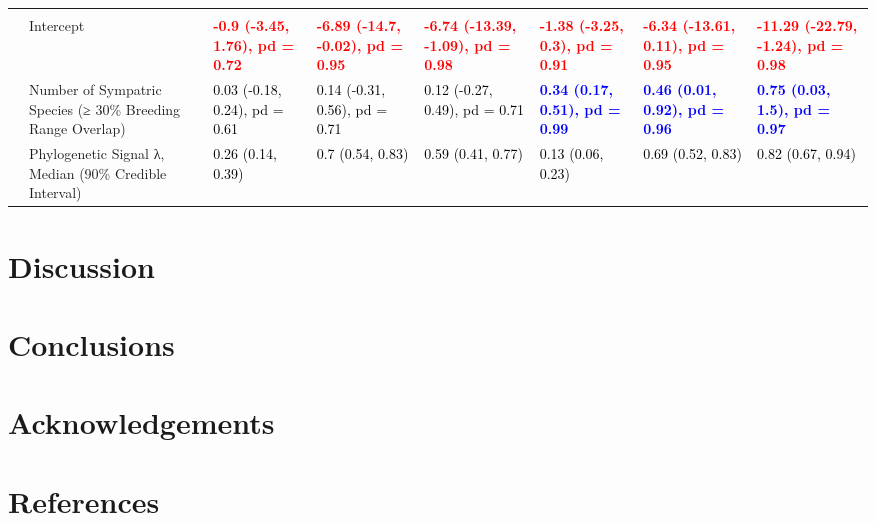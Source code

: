\begin{landscape}
\begin{table}
{\begin{tabular}[t]{llllllll}
\addlinespace[0.3em]
\multicolumn{1}{l}{\textbf{Breeding Sympatry}}\\
\hspace{1em} & Intercept & \textcolor{red}{\textbf{-0.9 (-3.45, 1.76), pd = 0.72}} & \textcolor{red}{\textbf{-6.89 (-14.7, -0.02), pd = 0.95}} & \textcolor{red}{\textbf{-6.74 (-13.39, -1.09), pd = 0.98}} & \textcolor{red}{\textbf{-1.38 (-3.25, 0.3), pd = 0.91}} & \textcolor{red}{\textbf{-6.34 (-13.61, 0.11), pd = 0.95}} & \textcolor{red}{\textbf{-11.29 (-22.79, -1.24), pd = 0.98}}\\
 & Number of Sympatric Species 
\hspace{1em} (≥ 30\% Breeding Range Overlap) & \textcolor{black}{0.03 (-0.18, 0.24), pd = 0.61} & \textcolor{black}{0.14 (-0.31, 0.56), pd = 0.71} & \textcolor{black}{0.12 (-0.27, 0.49), pd = 0.71} & \textcolor{blue}{\textbf{0.34 (0.17, 0.51), pd = 0.99}} & \textcolor{blue}{\textbf{0.46 (0.01, 0.92), pd = 0.96}} & \textcolor{blue}{\textbf{0.75 (0.03, 1.5), pd = 0.97}}\\
\hspace{1em} & Phylogenetic Signal λ, Median (90\% Credible Interval) & \textcolor{black}{0.26 (0.14, 0.39)} & \textcolor{black}{0.7 (0.54, 0.83)} & \textcolor{black}{0.59 (0.41, 0.77)} & \textcolor{black}{0.13 (0.06, 0.23)} & \textcolor{black}{0.69 (0.52, 0.83)} & \textcolor{black}{0.82 (0.67, 0.94)}\\
\bottomrule
\end{tabular}}
\end{table}
\end{landscape}

\hypertarget{discussion}{%
\section{Discussion}\label{discussion}}

\hypertarget{conclusions}{%
\section{Conclusions}\label{conclusions}}

\hypertarget{acknowledgements}{%
\section{Acknowledgements}\label{acknowledgements}}

\hypertarget{references}{%
\section*{References}\label{references}}

